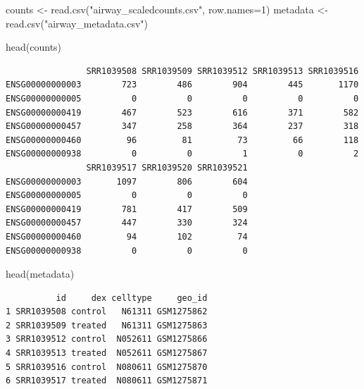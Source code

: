 \documentclass[
  letterpaper,
  DIV=11,
  numbers=noendperiod]{scrartcl}
\newenvironment{Shaded}{\begin{snugshade}}{\end{snugshade}}
\newcommand{\AttributeTok}[1]{\textcolor[rgb]{0.40,0.45,0.13}{#1}}
\newcommand{\DecValTok}[1]{\textcolor[rgb]{0.68,0.00,0.00}{#1}}
\newcommand{\FunctionTok}[1]{\textcolor[rgb]{0.28,0.35,0.67}{#1}}
\newcommand{\NormalTok}[1]{\textcolor[rgb]{0.00,0.23,0.31}{#1}}
\newcommand{\OtherTok}[1]{\textcolor[rgb]{0.00,0.23,0.31}{#1}}
\newcommand{\StringTok}[1]{\textcolor[rgb]{0.13,0.47,0.30}{#1}}
\begin{document}
\begin{Shaded}
\begin{Highlighting}[]
\NormalTok{counts }\OtherTok{\textless{}{-}} \FunctionTok{read.csv}\NormalTok{(}\StringTok{"airway\_scaledcounts.csv"}\NormalTok{, }\AttributeTok{row.names=}\DecValTok{1}\NormalTok{)}
\NormalTok{metadata }\OtherTok{\textless{}{-}}  \FunctionTok{read.csv}\NormalTok{(}\StringTok{"airway\_metadata.csv"}\NormalTok{)}
\end{Highlighting}
\end{Shaded}

\begin{Shaded}
\begin{Highlighting}[]
\FunctionTok{head}\NormalTok{(counts)}
\end{Highlighting}
\end{Shaded}

\begin{verbatim}
                SRR1039508 SRR1039509 SRR1039512 SRR1039513 SRR1039516
ENSG00000000003        723        486        904        445       1170
ENSG00000000005          0          0          0          0          0
ENSG00000000419        467        523        616        371        582
ENSG00000000457        347        258        364        237        318
ENSG00000000460         96         81         73         66        118
ENSG00000000938          0          0          1          0          2
                SRR1039517 SRR1039520 SRR1039521
ENSG00000000003       1097        806        604
ENSG00000000005          0          0          0
ENSG00000000419        781        417        509
ENSG00000000457        447        330        324
ENSG00000000460         94        102         74
ENSG00000000938          0          0          0
\end{verbatim}

\begin{Shaded}
\begin{Highlighting}[]
\FunctionTok{head}\NormalTok{(metadata)}
\end{Highlighting}
\end{Shaded}

\begin{verbatim}
          id     dex celltype     geo_id
1 SRR1039508 control   N61311 GSM1275862
2 SRR1039509 treated   N61311 GSM1275863
3 SRR1039512 control  N052611 GSM1275866
4 SRR1039513 treated  N052611 GSM1275867
5 SRR1039516 control  N080611 GSM1275870
6 SRR1039517 treated  N080611 GSM1275871
\end{verbatim}
\end{document}

